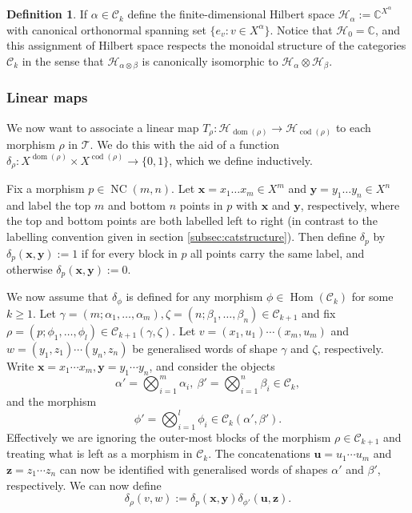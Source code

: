 \documentclass[12pt, a4paper]{amsart}
\def\NC{\operatorname{NC}}
\def\Hom{\operatorname{Hom}}
\def\C{\mathbb{C}}
\def\CC{\mathcal{C}}
\def\HH{\mathcal{H}}
\def\TT{\mathcal{T}}
\theoremstyle{definition}
\newtheorem{definition}[thm]{Definition}
\theoremstyle{remark}
\numberwithin{equation}{section}
\begin{document}
\begin{definition}\label{def:Halpha}
If $\alpha \in \CC_k$ define the finite-dimensional Hilbert space $\HH_\alpha := \C^{X^\alpha}$ with canonical orthonormal spanning set $\{e_v : v\in X^\alpha\}$. Notice that $\HH_0 = \C$, and this assignment of Hilbert space respects the monoidal structure of the categories $\CC_k$ in the sense that $\HH_{\alpha\otimes\beta}$ is canonically isomorphic to $\HH_\alpha\otimes\HH_\beta$.
\end{definition}


\subsubsection{Linear maps}

We now want to associate a linear map $T_\rho : \HH_{\operatorname{dom}(\rho)} \to \HH_{\operatorname{cod}(\rho)}$ to each morphism $\rho$ in $\TT$. We do this with the aid of a function $\delta_\rho:X^{\operatorname{dom}(\rho)}\times X^{\operatorname{cod}(\rho)}\to \{0,1\}$, which we define inductively.  

Fix a morphism $p\in\NC(m,n)$. Let $\mathbf{x}=x_1\dots x_m \in X^m$ and $\mathbf{y}=y_1 \dots y_n \in X^n$ and label the top $m$ and bottom $n$ points in $p$ with $\mathbf{x}$ and $\mathbf{y}$, respectively, where the top and bottom points are both labelled left to right (in contrast to the labelling convention given in section \ref{subsec:catstructure}). Then define $\delta_p$ by $\delta_p(\mathbf{x},\mathbf{y}):=1$ if for every block in $p$ all points carry the same label, and otherwise $\delta_p(\mathbf{x},\mathbf{y}):=0$. 

We now assume that $\delta_\phi$ is defined for any morphism $\phi\in\Hom(\CC_k)$ for some $k\geq 1$. Let $\gamma=(m;\alpha_1,\dots,\alpha_m), \zeta=(n;\beta_1,\dots,\beta_n) \in \CC_{k+1}$ and fix $\rho = (p;\phi_1,\dots,\phi_l) \in \CC_{k+1}(\gamma,\zeta)$. Let $v = (x_1,u_1)\cdots(x_m,u_m)$ and $w=(y_1,z_1)\cdots(y_n,z_n)$ be generalised words of shape $\gamma$ and $\zeta$, respectively. Write $\mathbf{x} = x_1\cdots x_m, \mathbf{y} = y_1\cdots y_n$, and consider the objects
\[
\alpha' = \bigotimes_{i=1}^m \alpha_i , \ \beta' = \bigotimes_{i=1}^n \beta_i \in \CC_k,
\]
and the morphism
\[
\phi' = \bigotimes_{i=1}^l \phi_i \in \CC_k(\alpha',\beta').
\]
Effectively we are ignoring the outer-most blocks of the morphism $\rho \in \CC_{k+1}$ and treating what is left as a morphism in $\CC_k$. The concatenations $\mathbf{u} = u_1\cdots u_m$ and $\mathbf{z} = z_1\cdots z_n$ can now be identified with generalised words of shapes $\alpha'$ and $\beta'$, respectively. We can now define
\[
\delta_\rho(v,w) := \delta_p(\mathbf{x},\mathbf{y}) \delta_{\phi'}(\mathbf{u},\mathbf{z}).
\]
\end{document}
